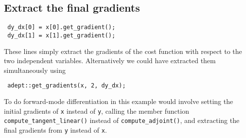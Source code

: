 \documentclass[a4,oneside]{book}
\def\codesize{\small}
\def\code#1{{\codesize\texttt{#1}}}
\begin{document}
\subsection{Extract the final gradients}

\begin{lstlisting}
 dy_dx[0] = x[0].get_gradient();
 dy_dx[1] = x[1].get_gradient();
\end{lstlisting}
These lines simply extract the gradients of the cost function
with respect to the two independent variables. Alternatively we could
have extracted them simultaneously using
\begin{lstlisting}
 adept::get_gradients(x, 2, dy_dx);
\end{lstlisting}

To do forward-mode differentiation in this example would involve
setting the initial gradients of \code{x} instead of \code{y}, calling
the member function \code{compute\_tangent\_linear()} instead of
\code{compute\_adjoint()}, and extracting the final gradients from
\code{y} instead of \code{x}.
\end{document}
